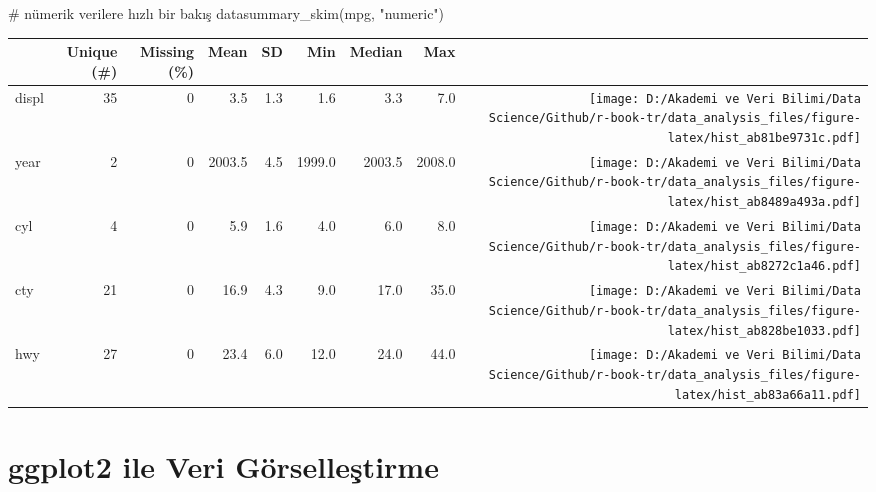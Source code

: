\documentclass[
  letterpaper,
  DIV=11,
  numbers=noendperiod]{scrreprt}
\newenvironment{Shaded}{\begin{snugshade}}{\end{snugshade}}
\newcommand{\CommentTok}[1]{\textcolor[rgb]{0.37,0.37,0.37}{#1}}
\newcommand{\FunctionTok}[1]{\textcolor[rgb]{0.28,0.35,0.67}{#1}}
\newcommand{\NormalTok}[1]{\textcolor[rgb]{0.00,0.23,0.31}{#1}}
\newcommand{\StringTok}[1]{\textcolor[rgb]{0.13,0.47,0.30}{#1}}
\begin{document}
\begin{Shaded}
\begin{Highlighting}[]
\CommentTok{\# nümerik verilere hızlı bir bakış}
\FunctionTok{datasummary\_skim}\NormalTok{(mpg, }\StringTok{"numeric"}\NormalTok{)}
\end{Highlighting}
\end{Shaded}

\begin{table}
\centering
\begin{tabular}[t]{lrrrrrrr>{}r}
\toprule
  & Unique (\#) & Missing (\%) & Mean & SD & Min & Median & Max &   \\
\midrule
displ & 35 & 0 & \num{3.5} & \num{1.3} & \num{1.6} & \num{3.3} & \num{7.0} & \texttt{[image: D:/Akademi ve Veri Bilimi/Data Science/Github/r-book-tr/data\_analysis\_files/figure-latex/hist\_ab81be9731c.pdf]}\\
year & 2 & 0 & \num{2003.5} & \num{4.5} & \num{1999.0} & \num{2003.5} & \num{2008.0} & \texttt{[image: D:/Akademi ve Veri Bilimi/Data Science/Github/r-book-tr/data\_analysis\_files/figure-latex/hist\_ab8489a493a.pdf]}\\
cyl & 4 & 0 & \num{5.9} & \num{1.6} & \num{4.0} & \num{6.0} & \num{8.0} & \texttt{[image: D:/Akademi ve Veri Bilimi/Data Science/Github/r-book-tr/data\_analysis\_files/figure-latex/hist\_ab8272c1a46.pdf]}\\
cty & 21 & 0 & \num{16.9} & \num{4.3} & \num{9.0} & \num{17.0} & \num{35.0} & \texttt{[image: D:/Akademi ve Veri Bilimi/Data Science/Github/r-book-tr/data\_analysis\_files/figure-latex/hist\_ab828be1033.pdf]}\\
hwy & 27 & 0 & \num{23.4} & \num{6.0} & \num{12.0} & \num{24.0} & \num{44.0} & \texttt{[image: D:/Akademi ve Veri Bilimi/Data Science/Github/r-book-tr/data\_analysis\_files/figure-latex/hist\_ab83a66a11.pdf]}\\
\bottomrule
\end{tabular}
\end{table}


\chapter*{ggplot2 ile Veri
Görselleştirme}\label{ggplot2-ile-veri-guxf6rselleux15ftirme}

\end{document}
